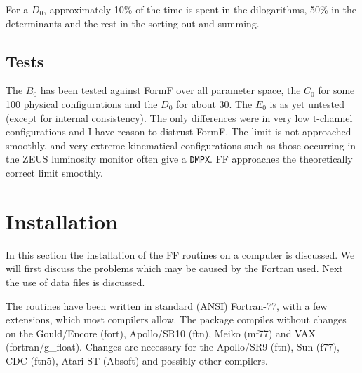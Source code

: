 For a $D_0$, approximately 10\% of the time is spent in the dilogarithms, 50\% 
in the determinants and the rest in the sorting out and summing.

\subsection{Tests}

The $B_0$ has been tested against FormF over all parameter space, the $C_0$ 
for some 100 physical configurations and the $D_0$ for about 30.  The $E_0$ is 
as yet untested (except for internal consistency). The only differences were 
in very low t-channel configurations and I have reason to distrust FormF\null. 
 The limit is not approached smoothly, and very extreme kinematical 
configurations such as those occurring in the ZEUS luminosity monitor 
\cite{vdHorstThesis} often give a {\tt DMPX}.  FF approaches the theoretically 
correct limit smoothly.

\section{Installation}
\label{sc:installation}

In this section the installation of the FF routines on a computer is 
discussed.  We will first discuss the problems which may be caused by the 
Fortran used.  Next the use of data files is discussed.

The routines have been written in standard (ANSI) Fortran-77, with a few 
extensions, which most compilers allow.  The package compiles without changes 
on the Gould/Encore (fort), Apollo/SR10 (ftn), Meiko (mf77) and VAX 
(fortran/g\_float).  Changes are necessary for the Apollo/SR9 (ftn), Sun (f77), CDC 
(ftn5), Atari ST (Absoft) and possibly other compilers.

